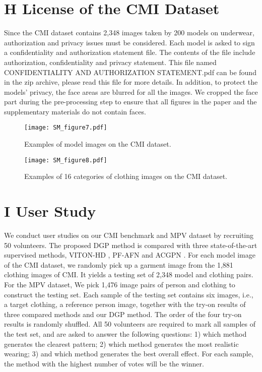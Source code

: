 \documentclass[10pt,twocolumn,letterpaper]{article}
\begin{document}
\section*{H License of the CMI Dataset}
Since the CMI dataset contains 2,348 images taken by 200 models on underwear, authorization and privacy issues must be considered. Each model is asked to sign a confidentiality and authorization statement file.
The contents of the file include authorization, confidentiality and privacy statement. This file named CONFIDENTIALITY AND AUTHORIZATION STATEMENT.pdf can be found in the zip archive, please read this file for more details.
In addition, to protect the models' privacy, the face areas are blurred for all the images. We cropped the face part during the pre-processing step to ensure that all figures in the paper and the supplementary materials do not contain faces.






\begin{figure}[h]
  \centering
  \texttt{[image: SM\_figure7.pdf]}
  \caption{Examples of model images on the CMI dataset.}\label{fig: SM_CMI_dataset}
\end{figure}


\begin{figure}[h]
  \centering
  \texttt{[image: SM\_figure8.pdf]}
  \caption{Examples of 16 categories of clothing images on the CMI dataset.}\label{fig: SM_CMI_dataset_cloth}
\end{figure}

\section*{I User Study}
We conduct user studies on our CMI benchmark and MPV \cite{dong2019towards} dataset by recruiting 50 volunteers.
The proposed DGP method is compared with three state-of-the-art supervised
methods, VITON-HD  \cite{choi2021viton}, PF-AFN \cite{ge2021parser,han2019clothflow} and ACGPN \cite{yang2020towards}. 
For each model image of the CMI dataset, we randomly pick up a garment image from the 1,881 clothing images of CMI. It yields a testing set of 2,348
model and clothing pairs. 
For the MPV dataset, We pick 1,476 image pairs of person and clothing to construct the testing set.
Each sample of the testing set contains six images, i.e., a target clothing, a reference person image, together with the try-on results of three compared methods and our DGP method. The order of the four try-on results is randomly shuffled. All 50 volunteers are required to mark all samples of the test set, and are asked to answer the following questions: 1) which method generates the clearest pattern; 2) which method generates the most realistic wearing; 3) and which method generates the
best overall effect. For each sample, the method with the highest number of votes will be the winner.
\end{document}
